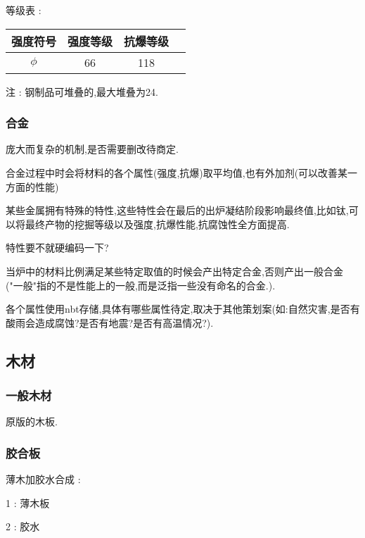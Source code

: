 {{{          等级表 :

          \begin{center}
              \begin{tabular}{|c|c|c|c|}
                  \hline
                  强度符号  & 强度等级 & 抗爆等级 \\
                  \hline
                  $\phi$ & 66       & 118            \\
                  \hline
              \end{tabular}
          \end{center}

          注 : 钢制品可堆叠的,最大堆叠为24.
      }

      \subsubsection{合金}{
          庞大而复杂的机制,是否需要删改待商定.

          合金过程中时会将材料的各个属性(强度,抗爆)取平均值,也有外加剂(可以改善某一方面的性能)

          某些金属拥有特殊的特性,这些特性会在最后的出炉凝结阶段影响最终值,比如钛,可以将最终产物的挖掘等级以及强度,抗爆性能,抗腐蚀性全方面提高.

          特性要不就硬编码一下?

          当炉中的材料比例满足某些特定取值的时候会产出特定合金,否则产出一般合金("一般"指的不是性能上的一般,而是泛指一些没有命名的合金.).

          各个属性使用nbt存储,具体有哪些属性待定,取决于其他策划案(如:自然灾害,是否有酸雨会造成腐蚀?是否有地震?是否有高温情况?).
      }
  }

  \subsection{木材}{
      \subsubsection{一般木材}{
          原版的木板.
      }

      \subsubsection{胶合板}{
          薄木加胶水合成 :
          \begin{center}
              1 : 薄木板

              2 : 胶水


\end{center}}}}
